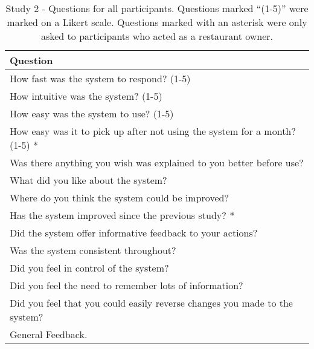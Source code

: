 \begin{table}[h]
    \centering
    \captionsetup{justification=centering}
    \begin{tabular}{ |p{\textwidth}| }
    \hline
    \textbf{Question}\\
    \hline
    How fast was the system to respond? (1-5) \\
    \hline
    How intuitive was the system? (1-5) \\
    \hline
    How easy was the system to use? (1-5) \\
    \hline
    How easy was it to pick up after not using the system for a month? (1-5) * \\
    \hline
    Was there anything you wish was explained to you better before use? \\
    \hline
    What did you like about the system? \\
    \hline
    Where do you think the system could be improved? \\
    \hline
    Has the system improved since the previous study? * \\
    \hline
    Did the system offer informative feedback to your actions? \\
    \hline
    Was the system consistent throughout? \\
    \hline
    Did you feel in control of the system? \\
    \hline
    Did you feel the need to remember lots of information? \\
    \hline
    Did you feel that you could easily reverse changes you made to the system? \\
    \hline
    General Feedback. \\
    \hline
    \end{tabular}
    \captionsetup{justification=centering}
    \caption[Study 2 - Questions for all participants]{Study 2 - Questions for all participants. Questions marked ``(1-5)'' were marked on a Likert scale. Questions marked with an asterisk were only asked to participants who acted as a restaurant owner.}
    \label{tab:Study2Questions}
\end{table}


